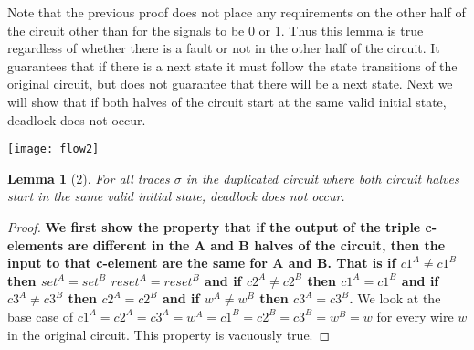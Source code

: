 \documentclass{article}
\newtheorem*{lemma}{Lemma}
\begin{document}
Note that the previous proof does not place any requirements on the other half of the circuit other than for the signals to be 0 or 1.  Thus this lemma is true regardless of whether there is a fault or not in the other half of the circuit.  It guarantees that if there is a next state it must follow the state transitions of the original circuit, but does not guarantee that there will be a next state.  Next we will show that if both halves of the circuit start at the same valid initial state, deadlock does not occur.

\texttt{[image: flow2]}
\begin{lemma}[2]
For all traces $\sigma$ in the duplicated circuit where both circuit halves start in the same valid initial state, deadlock does not occur.
\end{lemma}
\begin{proof}
\textbf{We first show the property that if the output of the triple c-elements are different in the A and B halves of the circuit, then the input to that c-element are the same for A and B.  That is if $c1^A\neq c1^B$ then $set^A=set^B$ $reset^A=reset^B$ and if $c2^A\neq c2^B$ then $c1^A=c1^B$ and if $c3^A\neq c3^B$ then $c2^A=c2^B$ and if $w^A\neq w^B$ then $c3^A=c3^B$.}  We look at the base case of $c1^A=c2^A=c3^A=w^A=c1^B=c2^B=c3^B=w^B=w$ for every wire $w$ in the original circuit.  This property is vacuously true. \newline


\end{proof}
\end{document}

